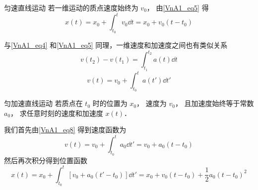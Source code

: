 \begin{exam}{匀速直线运动}
若一维运动的质点速度始终为 $v_0$， 由\autoref{VnA1_eq5} 得
\begin{equation}
x(t) = x_0 + \int_{t_0}^t v_0 \dd{t} = x_0 + v_0(t-t_0)
\end{equation}
\end{exam}

与\autoref{VnA1_eq4} 和\autoref{VnA1_eq5} 同理，一维速度和加速度之间也有类似关系
\begin{equation}
v(t_2) - v(t_1) = \int_{t_1}^{t_2} a(t) \dd{t}
\end{equation}
\begin{equation}\label{VnA1_eq8}
v(t) = v_0 + \int_{t_0}^t a(t') \dd{t'}
\end{equation}

\begin{exam}{匀加速直线运动}
若质点在 $t_0$ 时的位置为 $x_0$， 速度为 $v_0$， 且加速度始终等于常数 $a_0$， 求任意时刻的速度和加速度 $x(t)$．

我们首先由\autoref{VnA1_eq8} 得到速度函数为
\begin{equation}
v(t) = v_0 + \int_{t_0}^t a_0 \dd{t'} = v_0 + a_0 (t - t_0)
\end{equation}
然后再次积分得到位置函数
\begin{equation}
x(t) = x_0 + \int_{t_0}^t [v_0 + a_0 (t' - t_0)] \dd{t'} = x_0 + v_0 (t - t_0) +  \frac12 a_0 (t - t_0)^2
\end{equation}
\end{exam}
